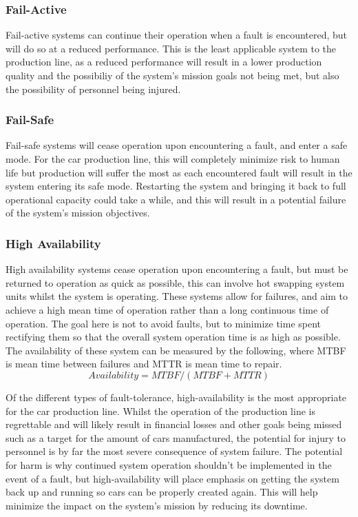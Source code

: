 \documentclass[]{report}
\begin{document}
				\subsubsection{Fail-Active}
				Fail-active systems can continue their operation when a fault is encountered, but will do so at a reduced performance. This is the least applicable system to the production line, as a reduced performance will result in a lower production quality and the possibiliy of the system's mission goals not being met, but also the possibility of personnel being injured. 
				
				\subsubsection{Fail-Safe}
				Fail-safe systems will cease operation upon encountering a fault, and enter a safe mode. For the car production line, this will completely minimize risk to human life but production will suffer the most as each encountered fault will result in the system entering its safe mode. Restarting the system and bringing it back to full operational capacity could take a while, and this will result in a potential failure of the system's mission objectives.
				
				\subsubsection{High Availability}
				High availability systems cease operation upon encountering a fault, but must be returned to operation as quick as possible, this can involve hot swapping system units whilst the system is operating. These systems allow for failures, and aim to achieve a high mean time of operation rather than a long continuous time of operation. The goal here is not to avoid faults, but to minimize time spent rectifying them so that the overall system operation time is as high as possible\cite{gray1991high}. The availability of these system can be measured by the following, where MTBF is mean time between failures and MTTR is mean time to repair.
				\begin{equation*}
				Availability = MTBF/(MTBF + MTTR)
				\end{equation*}
				
				Of the different types of fault-tolerance, high-availability is the most appropriate for the car production line. Whilst the operation of the production line is regrettable and will likely result in financial losses and other goals being missed such as a target for the amount of cars manufactured, the potential for injury to personnel is by far the most severe consequence of system failure. The potential for harm is why continued system operation shouldn't be implemented in the event of a fault, but high-availability will place emphasis on getting the system back up and running so cars can be properly created again. This will help minimize the impact on the system's mission by reducing its downtime.
			
\end{document}
